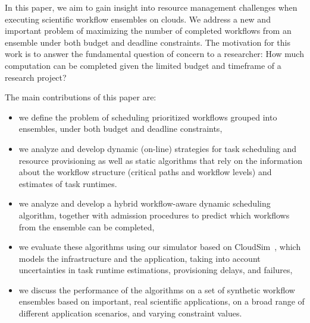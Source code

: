 \documentclass[conference]{IEEEtran}
\begin{document}
In this paper, we aim to gain insight into resource management challenges when
executing scientific workflow ensembles on clouds. We address a
new and important problem of maximizing the number of completed workflows from
an ensemble under both budget and deadline constraints. The motivation for this
work is to answer the fundamental question of concern to a researcher: How much
computation can be completed given the limited budget and timeframe of a
research project? 

The main contributions of this paper are:
\begin{itemize}
  \item we define the problem of scheduling prioritized workflows grouped
  into ensembles, under both budget and deadline constraints,
  \item we analyze and develop dynamic (on-line) strategies for task scheduling
  and resource provisioning as well as static algorithms that
  rely on the information about the workflow structure (critical paths and
  workflow levels) and estimates of task runtimes. 
  \item we analyze and develop a hybrid workflow-aware dynamic scheduling
  algorithm, together with admission procedures to predict which workflows from
  the ensemble can be completed,
  \item we evaluate these algorithms using our simulator based on
  CloudSim~\cite{Calheiros2011}, which models the infrastructure and the application, 
  taking into account uncertainties in task runtime
  estimations, provisioning delays, and failures, 
  \item we discuss the performance of the algorithms on a set of
  synthetic workflow ensembles based on important, real scientific
  applications, on a broad range of different application scenarios, and
  varying constraint values.
\end{itemize}

\end{document}
